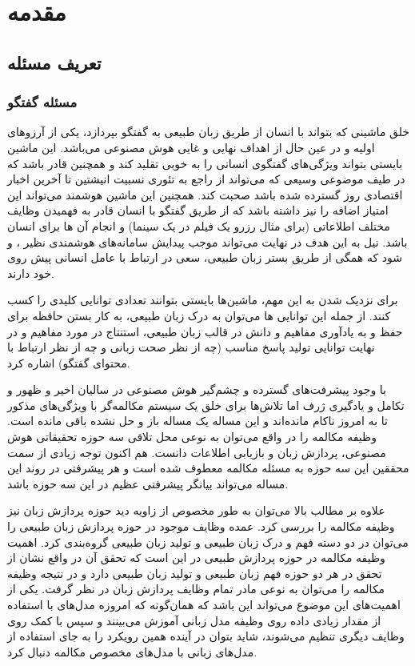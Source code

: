 \chapter{مقدمه}\label{Chap:Chap1}
\minitoc

\section{تعریف مسئله} \label{chap1:prob_define}

\subsection{‌مسئله گفتگو}
خلق ماشینی که بتواند با انسان از طریق زبان طبیعی به گفتگو بپردازد، یکی از آرزو‌های اولیه و در عین حال از اهداف نهایی و غایی هوش مصنوعی می‌باشد.
این ماشین بایستی بتواند ویژگی‌های گفتگوی انسانی را به خوبی تقلید کند و همچنین قادر باشد که در طیف موضوعی وسیعی که می‌تواند از راجع به تئوری نسبیت انیشتین تا آخرین اخبار اقتصادی روز گسترده ‌شده باشد صحبت کند.
همچنین این ماشین هوشمند می‌تواند این امتیاز اضافه را نیز داشته باشد که از طریق گفتگو با انسان قادر به فهمیدن وظایف مختلف اطلاعاتی (برای مثال رزرو یک فیلم در یک سینما) و انجام آن ها برای انسان باشد.
نیل به این هدف در نهایت می‌تواند موجب پیدایش سامانه‌های هوشمندی نظیر
، 
 و 
  شود که همگی از طریق 
بستر زبان طبیعی، سعی در ارتباط با عامل انسانی پیش‌ روی خود دارند.

برای نزدیک شدن به این مهم، ماشین‌ها بایستی بتوانند تعدادی توانایی کلیدی را کسب کنند. از جمله این توانایی ها می‌توان به درک زبان طبیعی، به کار بستن حافظه برای حفظ و به یادآوری مفاهیم و دانش در قالب زبان طبیعی،‌ استنتاج در مورد مفاهیم و در نهایت توانایی تولید پاسخ مناسب (چه از نظر صحت زبانی و چه از نظر ارتباط با محتوای گفتگو) اشاره کرد.

با وجود پیشرفت‌های گسترده و چشم‌گیر هوش مصنوعی در سالیان اخیر و ظهور و تکامل  و یادگیری ژرف اما تلاش‌ها برای خلق یک سیستم مکالمه‌گر با ویژگی‌های مذکور تا به امروز ناکام مانده‌اند و این مساله یک مساله باز و حل نشده باقی مانده است.
وظیفه مکالمه را در واقع می‌توان به نوعی محل تلاقی سه حوزه تحقیقاتی
هوش مصنوعی، پردازش زبان و بازیابی اطلاعات دانست.
هم اکنون توجه زیادی از سمت محققین این سه حوزه به مسئله مکالمه معطوف شده است و هر پیشرفتی در روند این مساله می‌تواند بیانگر پیشرفتی عظیم در این سه حوزه باشد.

علاوه بر مطالب بالا می‌توان به طور مخصوص از زاویه دید حوزه پردازش زبان نیز وظیفه مکالمه را بررسی کرد. عمده وظایف موجود در حوزه پردازش زبان طبیعی را می‌توان در دو دسته فهم و درک زبان طبیعی و تولید زبان طبیعی گروه‌بندی کرد. اهمیت وظیفه مکالمه در حوزه پردازش طبیعی در این است که تحقق آن در واقع نشان از تحقق در هر دو حوزه فهم زبان طبیعی و تولید زبان طبیعی دارد و در نتیجه وظیفه مکالمه را می‌توان به نوعی مادر تمام وظایف پردازش زبان در نظر گرفت. یکی از اهمیت‌های این موضوع می‌تواند این باشد که همان‌گونه که امروزه مدل‌های 
 با استفاده از مقدار زیادی داده روی وظیفه مدل زبانی آموزش می‌بینند و سپس با کمک 
  روی وظایف دیگری تنظیم می‌شوند، شاید بتوان در آینده همین رویکرد را به جای استفاده از مدل‌های زبانی با مدل‌های مخصوص مکالمه دنبال کرد.




